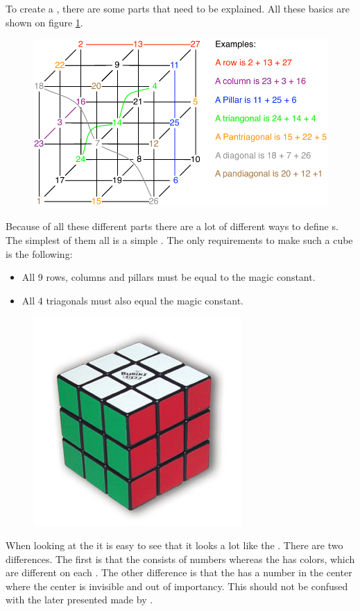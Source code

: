 To create a  \mcube{}, there are some parts that need to be explained.
All these basics are shown on figure \ref{fig:cubeparts}.

\begin{figure}[htb]
	\centering
		\includegraphics[scale=0.5]{input/pics/cubeparts.pdf}
	\caption{}
	\label{fig:cubeparts}
\end{figure}

Because of all these different parts there are a lot of different ways to define  \mcube{}s.
The simplest of them all is a simple  \mcube{}. The only requirements to make such a cube is the following:
\begin{itemize}
	\item All 9 rows, columns and pillars must be equal to the magic constant.
	\item All 4 triagonals must also equal the magic constant.
\end{itemize}

\begin{figure}[htb]
	\centering
		\includegraphics[scale=0.4]{input/pics/rubiksCube}
	\caption{}
	\label{fig:rubiksCube}
\end{figure}

When looking at the \rubik{} it is easy to see that it looks a lot like the \mcube{}. 
There are two differences. 
The first is that the \mcube{} consists of numbers whereas the \rubik{} has colors, which are different on each \face{}.
The other difference is that the \mcube{} has a number in the center where the \rubik{} center is invisible and out of importancy. This \mcube{} should not be confused with the later presented \mcube{} made by \erno{}.
